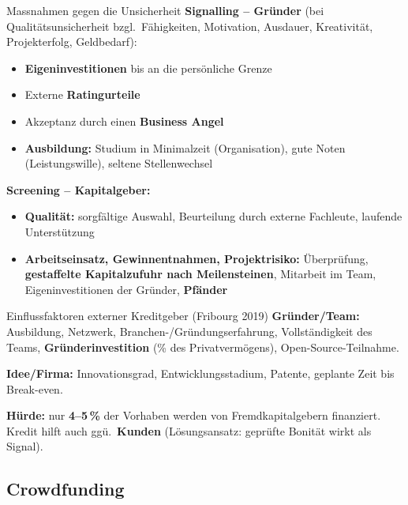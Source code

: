 \documentclass[a4paper, fontsize=7pt]{scrartcl}
\begin{document}
\begin{mainbox}{Massnahmen gegen die Unsicherheit}
\textbf{Signalling -- Gründer} (bei Qualitätsunsicherheit bzgl.\ Fähigkeiten,
Motivation, Ausdauer, Kreativität, Projekterfolg, Geldbedarf):
\begin{itemize}
    \item \textbf{Eigeninvestitionen} bis an die persönliche Grenze
    \item Externe \textbf{Ratingurteile}
    \item Akzeptanz durch einen \textbf{Business Angel}
    \item \textbf{Ausbildung:} Studium in Minimalzeit (Organisation), gute
    Noten (Leistungswille), seltene Stellenwechsel
\end{itemize}
\textbf{Screening -- Kapitalgeber:}
\begin{itemize}
    \item \textbf{Qualität:} sorgfältige Auswahl, Beurteilung durch externe
    Fachleute, laufende Unterstützung
    \item \textbf{Arbeitseinsatz, Gewinnentnahmen, Projektrisiko:}
    Überprüfung, \textbf{gestaffelte Kapitalzufuhr nach Meilensteinen},
    Mitarbeit im Team, Eigeninvestitionen der Gründer, \textbf{Pfänder}
\end{itemize}
\end{mainbox}

\begin{mainbox}{Einflussfaktoren externer Kreditgeber (Fribourg 2019)}
\textbf{Gründer/Team:} Ausbildung, Netzwerk, Branchen-/Gründungserfahrung,
Vollständigkeit des Teams, \textbf{Gründerinvestition} (\% des
Privatvermögens), Open-Source-Teilnahme.

\textbf{Idee/Firma:} Innovationsgrad, Entwicklungsstadium, Patente, geplante
Zeit bis Break-even.

\textbf{Hürde:} nur \textbf{4--5\,\%} der Vorhaben werden von
Fremdkapitalgebern finanziert. Kredit hilft auch ggü.\ \textbf{Kunden}
(Lösungsansatz: geprüfte Bonität wirkt als Signal).
\end{mainbox}

\subsection{Crowdfunding}
\end{document}
